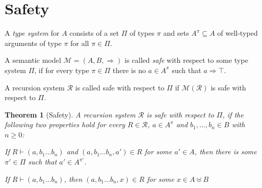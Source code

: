 \documentclass[a4paper,draft,preprint,sort&compress]{elsarticle}
\newtheorem{theorem}[definition]{Theorem}
\newtheorem{lemma}[definition]{Lemma}
\newcommand{\M}{\ensuremath{\mathcal{M}}}
\newcommand{\R}{\ensuremath{\mathcal{R}}}
\begin{document}
\section{Safety}
\label{sec:Safety}


A \emph{type system} for $A$ consists of a set $\Pi$ of types $\pi$ and sets $A^\pi \subseteq A$
of well-typed arguments of type $\pi$ for all $\pi \in \Pi$.

\begin{definition} \label{def:Safety}
  A semantic model $\mathcal{M} = (A,B,\Rightarrow)$ is called \emph{safe} with respect to
  some type system $\Pi$, if for every type $\pi \in \Pi$ there is no $a \in A^\pi$ such that
  $a \Rightarrow \top$.
\end{definition}

A recursion system $\R$ is called safe with respect to $\Pi$ if $\M(\R)$ is safe with
respect to $\Pi$.



\begin{theorem}[Safety]
  A recursion system $\R$ is safe with respect to $\Pi$, if the following two properties 
  hold for every $R \in \R$, $a \in A^\pi$ and $b_1,\ldots,b_n \in B$ with $n \ge 0$:
  \begin{description}[labelindent=\parindent,style=nextline]
  \item[Local Preservation]

    If \mbox{$R \vdash (a,b_1 \ldots b_n)$} and \mbox{$(a,b_1 \ldots b_n,a') \in R$} for
    some $a' \in A$, then there is some $\pi' \in \Pi$ such that $a' \in A^{\pi'}$.

  \item[Local Progress]

    If \mbox{$R \vdash (a,b_1 \ldots b_n)$}, then \mbox{$(a,b_1 \ldots b_n,x) \in R$} for
    some \mbox{$x \in A \uplus B$}

  \end{description}
\end{theorem}
\end{document}
